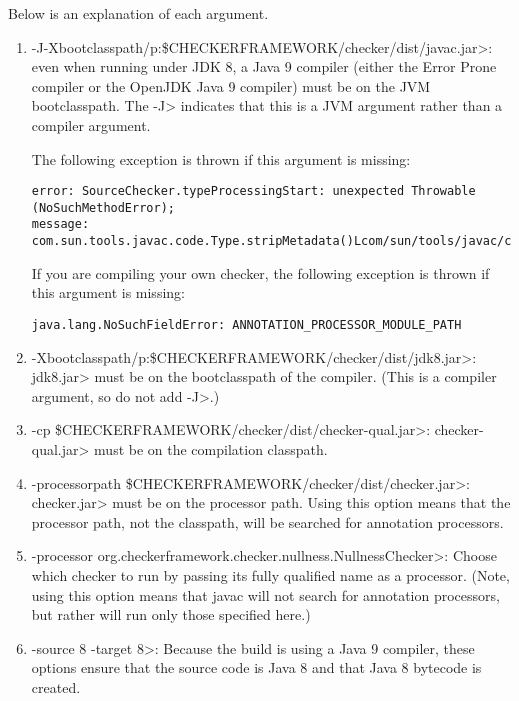Below is an explanation of each argument.
\begin{enumerate}
\item \<-J-Xbootclasspath/p:\$CHECKERFRAMEWORK/checker/dist/javac.jar>:
even when running under JDK 8, a Java 9 compiler (either the Error Prone
compiler or the OpenJDK Java 9 compiler) must be on the JVM bootclasspath.
The \<-J> indicates that this is a JVM argument rather than a compiler
argument.

The following exception is thrown if this argument is missing:
\begin{Verbatim}
error: SourceChecker.typeProcessingStart: unexpected Throwable (NoSuchMethodError);
message: com.sun.tools.javac.code.Type.stripMetadata()Lcom/sun/tools/javac/code/Type;
\end{Verbatim}

If you are compiling your own checker, the following exception is thrown if this argument is missing:
\begin{Verbatim}
java.lang.NoSuchFieldError: ANNOTATION_PROCESSOR_MODULE_PATH
\end{Verbatim}

\item \<-Xbootclasspath/p:\$CHECKERFRAMEWORK/checker/dist/jdk8.jar>: \<jdk8.jar>
  must be on the bootclasspath of the compiler.
  (This is a compiler argument, so do not add \<-J>.)

\item \<-cp \$CHECKERFRAMEWORK/checker/dist/checker-qual.jar>: \<checker-qual.jar>
must be on the compilation classpath.

\item \<-processorpath \$CHECKERFRAMEWORK/checker/dist/checker.jar>:
\<checker.jar> must be on the processor path. Using this option means that the processor path, not
the classpath, will be searched for annotation processors.

\item \<-processor org.checkerframework.checker.nullness.NullnessChecker>:
Choose which checker to run by passing its fully qualified name as a processor.
(Note, using this option means that javac will not search for annotation
processors, but rather will run only those specified here.)

\item \<-source 8 -target 8>: Because the build is using
a Java 9 compiler, these options ensure that the
source code is Java 8 and that Java 8 bytecode is created.

\end{enumerate}


